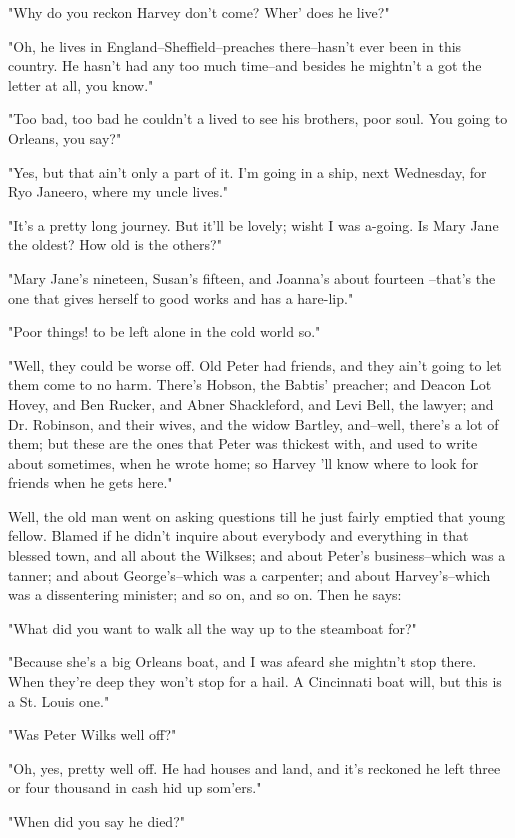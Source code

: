 "Why do you reckon Harvey don't come?  Wher' does he live?"

"Oh, he lives in England--Sheffield--preaches there--hasn't ever been in
this country.  He hasn't had any too much time--and besides he mightn't a
got the letter at all, you know."

"Too bad, too bad he couldn't a lived to see his brothers, poor soul.
You going to Orleans, you say?"

"Yes, but that ain't only a part of it.  I'm going in a ship, next
Wednesday, for Ryo Janeero, where my uncle lives."

"It's a pretty long journey.  But it'll be lovely; wisht I was a-going.
Is Mary Jane the oldest?  How old is the others?"

"Mary Jane's nineteen, Susan's fifteen, and Joanna's about fourteen
--that's the one that gives herself to good works and has a hare-lip."


"Poor things! to be left alone in the cold world so."

"Well, they could be worse off.  Old Peter had friends, and they ain't
going to let them come to no harm.  There's Hobson, the Babtis' preacher;
and Deacon Lot Hovey, and Ben Rucker, and Abner Shackleford, and Levi
Bell, the lawyer; and Dr. Robinson, and their wives, and the widow
Bartley, and--well, there's a lot of them; but these are the ones that
Peter was thickest with, and used to write about sometimes, when he wrote
home; so Harvey 'll know where to look for friends when he gets here."

Well, the old man went on asking questions till he just fairly emptied
that young fellow.  Blamed if he didn't inquire about everybody and
everything in that blessed town, and all about the Wilkses; and about
Peter's business--which was a tanner; and about George's--which was a
carpenter; and about Harvey's--which was a dissentering minister; and so
on, and so on.  Then he says:

"What did you want to walk all the way up to the steamboat for?"

"Because she's a big Orleans boat, and I was afeard she mightn't stop
there.  When they're deep they won't stop for a hail.  A Cincinnati boat
will, but this is a St. Louis one."

"Was Peter Wilks well off?"

"Oh, yes, pretty well off.  He had houses and land, and it's reckoned he
left three or four thousand in cash hid up som'ers."

"When did you say he died?"

